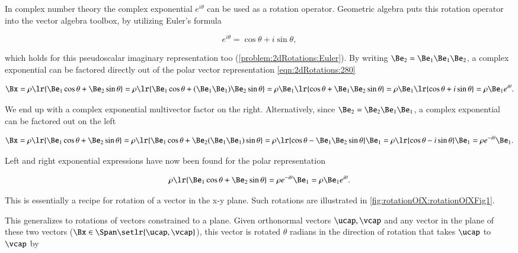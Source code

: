 In complex number theory the complex exponential \( e^{i\theta} \) can be used as a rotation operator.
Geometric algebra puts this rotation operator into the vector algebra toolbox, by utilizing
Euler's formula

\begin{dmath}\label{eqn:2dRotations:1140}
e^{i\theta} = \cos\theta + i \sin\theta,
\end{dmath}

which holds for this pseudoscalar imaginary representation too (\cref{problem:2dRotations:Euler}).
By writing \( \Be_2 = \Be_1 \Be_1 \Be_2 \),
a complex exponential can be factored directly out of the polar vector representation \cref{eqn:2dRotations:280}

\begin{dmath}\label{eqn:2dRotations:940}
\Bx
=
\rho \lr{ \Be_1 \cos\theta + \Be_2 \sin\theta }
=
\rho \lr{ \Be_1 \cos\theta + (\Be_1 \Be_1) \Be_2 \sin\theta }
=
\rho \Be_1 \lr{ \cos\theta + \Be_1 \Be_2 \sin\theta }
=
\rho \Be_1 \lr{ \cos\theta + i \sin\theta }
=
\rho \Be_1 e^{i\theta}.
\end{dmath}

We end up with a complex exponential multivector factor on the right.
Alternatively, since \( \Be_2 = \Be_2 \Be_1 \Be_1 \), a complex exponential can be factored out on the left

\begin{dmath}\label{eqn:2dRotations:960}
\Bx
=
\rho \lr{ \Be_1 \cos\theta + \Be_2 \sin\theta }
=
\rho \lr{ \Be_1 \cos\theta + \Be_2 (\Be_1 \Be_1) \sin\theta }
=
\rho \lr{ \cos\theta - \Be_1 \Be_2 \sin\theta } \Be_1
=
\rho \lr{ \cos\theta - i \sin\theta } \Be_1
=
\rho e^{-i\theta} \Be_1.
\end{dmath}

Left and right exponential expressions have now been found for the polar representation

\begin{equation}\label{eqn:2dRotations:1120}
\rho \lr{ \Be_1 \cos\theta + \Be_2 \sin\theta }
= \rho e^{-i\theta} \Be_1 = \rho \Be_1 e^{i\theta}.
\end{equation}

This is essentially a recipe for rotation of a vector in the x-y plane.
Such rotations are
illustrated in \cref{fig:rotationOfX:rotationOfXFig1}.

This generalizes to rotations of  vectors constrained to a plane.
Given orthonormal vectors \( \ucap, \vcap \) and any vector in the plane of these two vectors (\( \Bx \in \Span\setlr{\ucap,\vcap} \)), this vector is rotated \( \theta \) radians in the direction of rotation that takes \( \ucap \) to \( \vcap \) by


